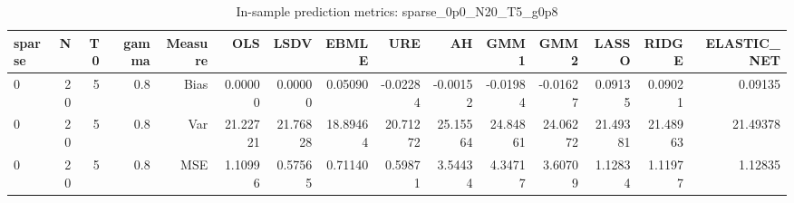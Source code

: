 \begin{table}[!htbp]\centering
\caption{In-sample prediction metrics: sparse_0p0_N20_T5_g0p8}
\label{tab:table2_sparse_0p0_N20_T5_g0p8}
\begin{tabular}{lrrrrrrrrrrrrrr}
\hline
sparse & N & T0 & gamma & Measure & OLS & LSDV & EBMLE & URE & AH & GMM1 & GMM2 & LASSO & RIDGE & ELASTIC_NET \\
\hline
0 & 20 & 5 & 0.8 & Bias & 0.00000 & 0.00000 & 0.05090 & -0.02284 & -0.00152 & -0.01984 & -0.01627 & 0.09135 & 0.09021 & 0.09135 \\
0 & 20 & 5 & 0.8 & Var & 21.22721 & 21.76828 & 18.89464 & 20.71272 & 25.15564 & 24.84861 & 24.06272 & 21.49381 & 21.48963 & 21.49378 \\
0 & 20 & 5 & 0.8 & MSE & 1.10996 & 0.57565 & 0.71140 & 0.59871 & 3.54434 & 4.34717 & 3.60709 & 1.12834 & 1.11977 & 1.12835 \\
\hline
\end{tabular}
\end{table}

